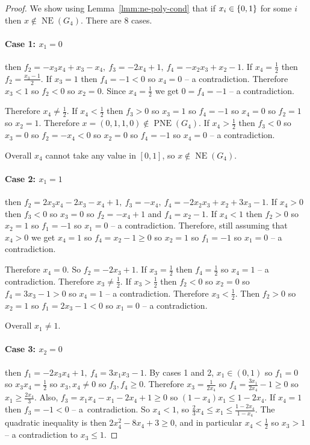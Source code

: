 \documentclass[preprint,12pt,authoryear]{elsarticle}
\DeclarePairedDelimiter{\ios}{\{}{\}}
\newcommand{\s}{\ios*}
\DeclareMathOperator{\NE}{NE}
\DeclareMathOperator{\PNE}{PNE}
\begin{document}
\begin{proof}
  We show using Lemma~\ref{lmm:ne-poly-cond} that if $x_i\in\s{0,1}$ for some $i$ then 
  $x\notin\NE(G_4)$. There are 8 cases.

  \paragraph{Case 1: $x_1=0$} then $f_2=-x_3x_4+x_3-x_4,~f_3=-2x_4+1,~f_4=-x_2x_3+x_2-1$.
  If $x_4=\frac{1}{2}$ then $f_2=\frac{x_3-1}{2}$. If $x_3=1$ then $f_4=-1<0$ so $x_4=0$ -- 
  a contradiction. Therefore $x_3<1$ so $f_2<0$ so $x_2=0$. Since $x_4=\frac{1}{2}$ we get
  $0=f_4=-1$ -- a contradiction.

  Therefore $x_4\ne\frac{1}{2}$. If $x_4<\frac{1}{2}$ then $f_3>0$ so $x_3=1$ so $f_4=-1$ 
  so $x_4=0$ so $f_2=1$ so $x_2=1$. Therefore $x=(0,1,1,0)\notin\PNE(G_4)$. If 
  $x_4>\frac{1}{2}$ then $f_3<0$ so $x_3=0$ so $f_2=-x_4<0$ so $x_2=0$ so $f_4=-1$ so 
  $x_4=0$ -- a contradiction.

  Overall $x_4$ cannot take any value in $[0,1]$, so $x\notin\NE(G_4)$.

  \paragraph{Case 2: $x_1=1$} then 
  $f_2=2x_3x_4-2x_3-x_4+1,~f_3=-x_4,~f_4=-2x_2x_3+x_2+3x_3-1$.
  If $x_4>0$ then $f_3<0$ so $x_3=0$ so $f_2=-x_4+1$ and $f_4=x_2-1$. If $x_4<1$ then 
  $f_2>0$ so $x_2=1$ so $f_1=-1$ so $x_1=0$ -- a contradiction. Therefore, still assuming 
  that $x_4>0$ we get $x_4=1$ so $f_4=x_2-1\ge0$ so $x_2=1$ so $f_1=-1$ so $x_1=0$ -- a 
  contradiction.

  Therefore $x_4=0$. So $f_2=-2x_3+1$. If $x_3=\frac{1}{2}$ then $f_4=\frac{1}{2}$ so 
  $x_4=1$ -- a contradiction. Therefore $x_3\ne\frac{1}{2}$. If $x_3>\frac{1}{2}$ then 
  $f_2<0$ so $x_2=0$ so $f_4=3x_3-1>0$ so $x_4=1$ -- a contradiction. Therefore 
  $x_3<\frac{1}{2}$. Then $f_2>0$ so $x_2=1$ so $f_1=2x_3-1<0$ so $x_1=0$ -- a 
  contradiction.

  Overall $x_1\ne1$.

  \paragraph{Case 3: $x_2=0$} then $f_1=-2x_3x_4+1,~f_4=3x_1x_3-1$. By cases 1 and 2, 
  $x_1\in(0,1)$ so $f_1=0$ so $x_3x_4=\frac{1}{2}$ so $x_3,x_4\ne0$ so $f_3,f_4\ge0$.  
  Therefore $x_3=\frac{1}{2x_4}$ so $f_4=\frac{3x_1}{2x_4}-1\ge0$ so 
  $x_1\ge\frac{2x_4}{3}$. Also, $f_3=x_1x_4-x_1-2x_4+1\ge0$ so $(1-x_4)x_1\le1-2x_4$. If 
  $x_4=1$ then $f_3=-1<0$ -- a~contradiction. So $x_4<1$, so
  $\frac{2}{3}x_4\le x_1\le\frac{1-2x_4}{1-x_4}$. The quadratic inequality is then 
  $2x_4^2-8x_4+3\ge0$, and in particular $x_4<\frac{1}{2}$ so $x_3>1$ -- a contradiction to 
  $x_3\le1$.


\end{proof}
\end{document}
